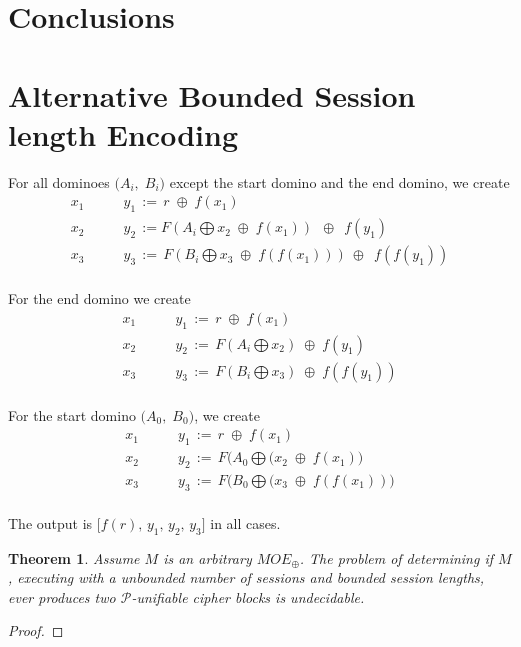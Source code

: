\documentclass{easychair}
\newtheorem{theorem}{Theorem}
\begin{document}
\section{Conclusions}


\appendix

\section{Alternative Bounded Session length Encoding}
For all dominoes $\big( A_i , \; B_i \big)$ except the start domino and the end domino, we create
\[
\begin{array}{cl}
x_1 & \qquad y_1 \, := \, r \; \oplus \; f( x_1 ) \\[+10pt]
x_2 & \qquad y_2 \, := F(A_i \bigoplus  x_2 \; \oplus \;   f(x_1))\; ~ \oplus ~ \; f( y_1 ) \\[+10pt]
x_3 & \qquad y_3 \, := \,  F(B_i \bigoplus  x_3 \; \oplus \; f(f(x_1))) ~ \oplus ~ \; f(f( y_1 )) \\[+10pt]
\end{array}
\]

For the end domino we create
\[
\begin{array}{cl}
x_1 & \qquad y_1 \, := \, r \; \oplus \; f( x_1 ) \\[+10pt]
x_2 & \qquad y_2 \, := \, F(A_i \bigoplus x_2) \; \oplus \;   f( y_1 ) \\[+10pt]
x_3 & \qquad y_3 \, := \,  F(B_i \bigoplus x_3) \; \oplus \; f(f( y_1 )) \\[+10pt]
\end{array}
\]


For the start domino $\big( A_0 , \; B_0 \big)$, we create
\[
\begin{array}{cl}
x_1 & \qquad y_1 \, := \, r \; \oplus \; f( x_1 ) \\[+10pt]
x_2 & \qquad y_2 \, := \, F(A_0 \bigoplus( x_2  \; \oplus \;   f(x_1) \big)\\[+10pt]
x_3 & \qquad y_3 \, := \,  F(B_0 \bigoplus( x_3  \; \oplus \; f(f(x_1)) \big)\\[+10pt]
\end{array}
\]

The output is $\big[ f(r), \, y_1, \, y_2, \, y_3 \big]$ in all cases.


\begin{theorem}
	Assume $M$ is an arbitrary $MOE_{\oplus}$. The problem
	of determining if $M$, executing with 
	a unbounded number of sessions and bounded session
	lengths, ever produces two  $\mathcal{P}$-unifiable cipher blocks is undecidable. 
\end{theorem}
\begin{proof}
	
\end{proof}



\end{document}
